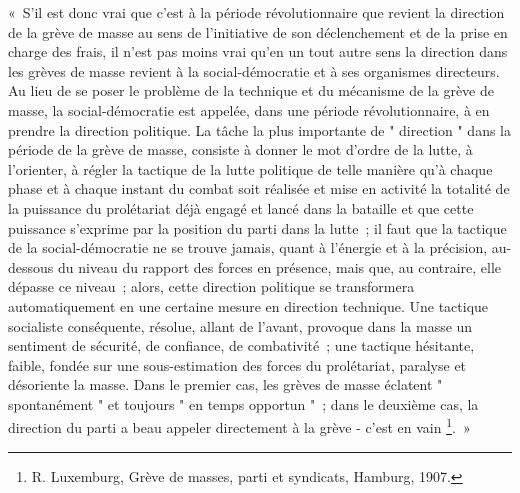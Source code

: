 \documentclass[french,twoside]{book} %
\newenvironment{quoteblock}%
  {\begin{quoting}}
  {\end{quoting}}
\newenvironment{quotebar}{%
    \def\FrameCommand{{\color{rubric!10!}\vrule width 0.5em} \hspace{0.9em}}%
    \def\OuterFrameSep{\itemsep} %
    \MakeFramed {\advance\hsize-\width \FrameRestore}
  }%
  {%
    \endMakeFramed
  }
\renewenvironment{quoteblock}%
  {%
    \savenotes
    \setstretch{0.9}
    \normalfont
    \begin{quotebar}
  }
  {%
    \end{quotebar}
    \spewnotes
  }
\begin{document}
\begin{quoteblock}
 \noindent « S'il est donc vrai que c’est à la période révolutionnaire que revient la direction de la grève de masse au sens de l’initiative de son déclenchement et de la prise en charge des frais, il n’est pas moins vrai qu’en un tout autre sens la direction dans les grèves de masse revient à la social-démocratie et à ses organismes directeurs. Au lieu de se poser le problème de la technique et du mécanisme de la grève de masse, la social-démocratie est appelée, dans une période révolutionnaire, à en prendre la direction politique. La tâche la plus importante de " direction " dans la période de la grève de masse, consiste à donner le mot d’ordre de la lutte, à l’orienter, à régler la tactique de la lutte politique de telle manière qu’à chaque phase et à chaque instant du combat soit réalisée et mise en activité la totalité de la puissance du prolétariat déjà engagé et lancé dans la bataille et que cette puissance s’exprime par la position du parti dans la lutte ; il faut que la tactique de la social-démocratie ne se trouve jamais, quant à l’énergie et à la précision, au-dessous du niveau du rapport des forces en présence, mais que, au contraire, elle dépasse ce niveau ; alors, cette direction politique se transformera automatiquement en une certaine mesure en direction technique. Une tactique socialiste conséquente, résolue, allant de l’avant, provoque dans la masse un sentiment de sécurité, de confiance, de combativité ; une tactique hésitante, faible, fondée sur une sous-estimation des forces du prolétariat, paralyse et désoriente la masse. Dans le premier cas, les grèves de masse éclatent " spontanément " et toujours " en temps opportun " ; dans le deuxième cas, la direction du parti a beau appeler directement à la grève - c’est en vain
\label{A2} \footnote{R. Luxemburg, Grève de masses, parti et syndicats, Hamburg, 1907.}. »
\end{quoteblock}
\end{document}
